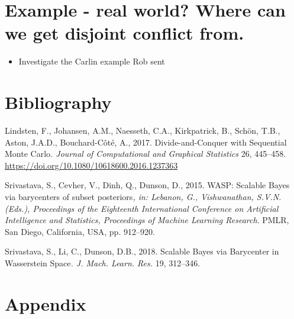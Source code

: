 \documentclass[10pt,a4paper,]{article}
\providecommand{\tightlist}{%
  \setlength{\itemsep}{0pt}\setlength{\parskip}{0pt}}
\begin{document}
\section{Example - real world? Where can we get disjoint conflict
from.}\label{example---real-world-where-can-we-get-disjoint-conflict-from.}

\begin{itemize}
\tightlist
\item
  Investigate the Carlin example Rob sent
\end{itemize}

\newpage

\section*{Bibliography}\label{bibliography}

\hypertarget{refs}{}
\hypertarget{ref-lindsten:etal:17}{}
Lindsten, F., Johansen, A.M., Naesseth, C.A., Kirkpatrick, B., Schön,
T.B., Aston, J.A.D., Bouchard-Côté, A., 2017. Divide-and-Conquer with
Sequential Monte Carlo\emph{. Journal of Computational and Graphical
Statistics} 26, 445--458.
\url{https://doi.org/10.1080/10618600.2016.1237363}

\hypertarget{ref-srivastava:etal:15}{}
Srivastava, S., Cevher, V., Dinh, Q., Dunson, D., 2015. WASP: Scalable
Bayes via barycenters of subset posteriors\emph{, in: Lebanon, G.,
Vishwanathan, S.V.N. (Eds.), Proceedings of the Eighteenth International
Conference on Artificial Intelligence and Statistics, Proceedings of
Machine Learning Research}. PMLR, San Diego, California, USA, pp.
912--920.

\hypertarget{ref-srivastava:li:dunson:18}{}
Srivastava, S., Li, C., Dunson, D.B., 2018. Scalable Bayes via
Barycenter in Wasserstein Space\emph{. J. Mach. Learn. Res.} 19,
312--346.

\newpage

\renewcommand{\thesection}{\Alph{section}}

\setcounter{section}{0}

\section{Appendix}\label{appendix}
\end{document}

